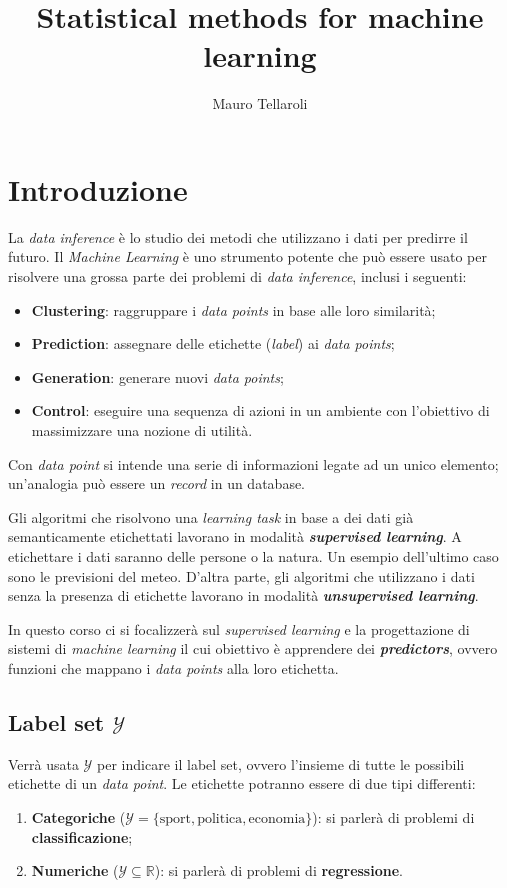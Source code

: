\documentclass[a4paper]{article}
\newcommand{\Y}{\ensuremath{\mathcal{Y}}}
\begin{document}
\title{Statistical methods for machine learning}
\author{Mauro Tellaroli}
\date{}
\maketitle

\section{Introduzione}

La \textit{data inference} è lo studio dei metodi che utilizzano i dati per predirre il futuro. 
Il \textit{Machine Learning} è uno strumento potente che può essere usato per risolvere una 
grossa parte dei problemi di \textit{data inference}, inclusi i seguenti:
\begin{itemize}
    \item \textbf{Clustering}: raggruppare i \textit{data points} in base alle loro similarità;
    \item \textbf{Prediction}: assegnare delle etichette (\textit{label}) ai \textit{data points};
    \item \textbf{Generation}: generare nuovi \textit{data points};
    \item    \textbf{Control}: eseguire una sequenza di azioni in un ambiente con l'obiettivo di
                               massimizzare una nozione di utilità.
\end{itemize}

Con \textit{data point} si intende una serie di informazioni legate ad un unico elemento;
un'analogia può essere un \textit{record} in un database.

Gli algoritmi che risolvono una \textit{learning task} in base a dei dati già semanticamente
etichettati lavorano in modalità \textbf{\textit{supervised learning}}. A etichettare i dati
saranno delle persone o la natura. Un esempio dell'ultimo caso sono le previsioni del meteo. 
D'altra parte, gli algoritmi che utilizzano i dati senza la presenza di etichette lavorano in
modalità \textbf{\textit{unsupervised learning}}.

In questo corso ci si focalizzerà sul \textit{supervised learning} e la progettazione di 
sistemi di \textit{machine learning} il cui obiettivo è apprendere dei 
\textbf{\textit{predictors}}, ovvero funzioni che mappano i \textit{data points} alla loro
etichetta.

\subsection*{Label set $\Y$}
Verrà usata $\Y$ per indicare il label set, ovvero l'insieme di tutte le possibili
etichette di un \textit{data point}. Le etichette potranno essere di due tipi differenti:
\begin{enumerate}
    \item \textbf{Categoriche} ($\Y = \{ \text{sport},\text{politica},\text{economia}\}$):
        si parlerà di problemi di \textbf{classificazione};
    \item \textbf{Numeriche} ($\Y \subseteq \mathbb{R} $): 
        si parlerà di problemi di \textbf{regressione}.
\end{enumerate}
\end{document}
